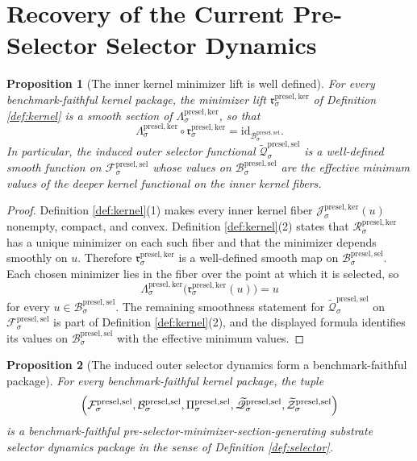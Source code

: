 \documentclass[11pt]{article}
\newcommand{\PreSectionSelectorSpace}[1]{\mathcal F_{#1}^{\mathrm{presel,sel}}}
\newcommand{\PreSectionSelectorBody}[1]{\mathcal B_{#1}^{\mathrm{presel,sel}}}
\newcommand{\PreSectionSelectorProj}[1]{\Pi_{#1}^{\mathrm{presel,sel}}}
\newcommand{\KernelProj}[1]{\Lambda_{#1}^{\mathrm{presel,ker}}}
\newcommand{\KernelFiber}[2]{\mathcal J_{#1}^{\mathrm{presel,ker}}(#2)}
\newcommand{\KernelFunctional}[1]{\mathscr R_{#1}^{\mathrm{presel,ker}}}
\newcommand{\KernelMinLift}[1]{\mathfrak r_{#1}^{\mathrm{presel,ker}}}
\newcommand{\InducedSelectorFunctional}[1]{\widetilde{\mathscr Q}_{#1}^{\mathrm{presel,sel}}}
\newcommand{\InducedSelectorShell}[1]{\widetilde{\mathcal Z}_{#1}^{\mathrm{presel,sel}}}
\newtheorem{proposition}{Proposition}
\begin{document}
\section{Recovery of the Current Pre-Selector Selector Dynamics}

\begin{proposition}[The inner kernel minimizer lift is well defined]
\label{prop:inner}
For every benchmark-faithful kernel package, the minimizer lift \(\KernelMinLift{\sigma}\) of Definition \ref{def:kernel} is a smooth section of \(\KernelProj{\sigma}\), so that
\[
\KernelProj{\sigma}\circ\KernelMinLift{\sigma}
=
\mathrm{id}_{\PreSectionSelectorBody{\sigma}}.
\]
In particular, the induced outer selector functional \(\InducedSelectorFunctional{\sigma}\) is a well-defined smooth function on \(\PreSectionSelectorSpace{\sigma}\) whose values on \(\PreSectionSelectorBody{\sigma}\) are the effective minimum values of the deeper kernel functional on the inner kernel fibers.
\end{proposition}

\begin{proof}
Definition \ref{def:kernel}(1) makes every inner kernel fiber \(\KernelFiber{\sigma}{u}\) nonempty, compact, and convex. Definition \ref{def:kernel}(2) states that \(\KernelFunctional{\sigma}\) has a unique minimizer on each such fiber and that the minimizer depends smoothly on \(u\). Therefore \(\KernelMinLift{\sigma}\) is a well-defined smooth map on \(\PreSectionSelectorBody{\sigma}\). Each chosen minimizer lies in the fiber over the point at which it is selected, so
\[
\KernelProj{\sigma}\bigl(\KernelMinLift{\sigma}(u)\bigr)=u
\]
for every \(u\in\PreSectionSelectorBody{\sigma}\). The remaining smoothness statement for \(\InducedSelectorFunctional{\sigma}\) on \(\PreSectionSelectorSpace{\sigma}\) is part of Definition \ref{def:kernel}(2), and the displayed formula identifies its values on \(\PreSectionSelectorBody{\sigma}\) with the effective minimum values.
\end{proof}

\begin{proposition}[The induced outer selector dynamics form a benchmark-faithful package]
\label{prop:selector}
For every benchmark-faithful kernel package, the tuple
\[
\Bigl(
\PreSectionSelectorSpace{\sigma},
\PreSectionSelectorBody{\sigma},
\PreSectionSelectorProj{\sigma},
\InducedSelectorFunctional{\sigma},
\InducedSelectorShell{\sigma}
\Bigr)
\]
is a benchmark-faithful pre-selector-minimizer-section-generating substrate selector dynamics package in the sense of Definition \ref{def:selector}.
\end{proposition}
\end{document}
